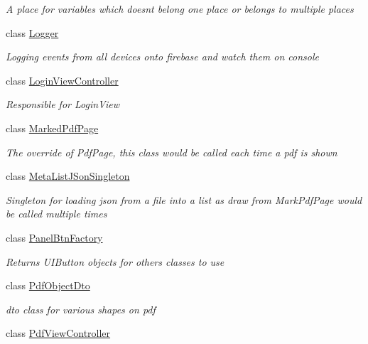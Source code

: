 \begin{DoxyCompactItemize}
\begin{DoxyCompactList}\small\item\em A place for variables which doesn\textquotesingle{}t belong one place or belongs to multiple places \end{DoxyCompactList}\item 
class \hyperlink{class_ramboell_1_1i_o_s_1_1_logger}{Logger}
\begin{DoxyCompactList}\small\item\em Logging events from all devices onto firebase and watch them on console \end{DoxyCompactList}\item 
class \hyperlink{class_ramboell_1_1i_o_s_1_1_login_view_controller}{Login\+View\+Controller}
\begin{DoxyCompactList}\small\item\em Responsible for Login\+View \end{DoxyCompactList}\item 
class \hyperlink{class_ramboell_1_1i_o_s_1_1_marked_pdf_page}{Marked\+Pdf\+Page}
\begin{DoxyCompactList}\small\item\em The override of Pdf\+Page, this class would be called each time a pdf is shown \end{DoxyCompactList}\item 
class \hyperlink{class_ramboell_1_1i_o_s_1_1_meta_list_j_son_singleton}{Meta\+List\+J\+Son\+Singleton}
\begin{DoxyCompactList}\small\item\em Singleton for loading json from a file into a list as draw from Mark\+Pdf\+Page would be called multiple times \end{DoxyCompactList}\item 
class \hyperlink{class_ramboell_1_1i_o_s_1_1_panel_btn_factory}{Panel\+Btn\+Factory}
\begin{DoxyCompactList}\small\item\em Returns U\+I\+Button objects for others classes to use \end{DoxyCompactList}\item 
class \hyperlink{class_ramboell_1_1i_o_s_1_1_pdf_object_dto}{Pdf\+Object\+Dto}
\begin{DoxyCompactList}\small\item\em dto class for various shapes on pdf \end{DoxyCompactList}\item 
class \hyperlink{class_ramboell_1_1i_o_s_1_1_pdf_view_controller}{Pdf\+View\+Controller}

\end{DoxyCompactItemize}
